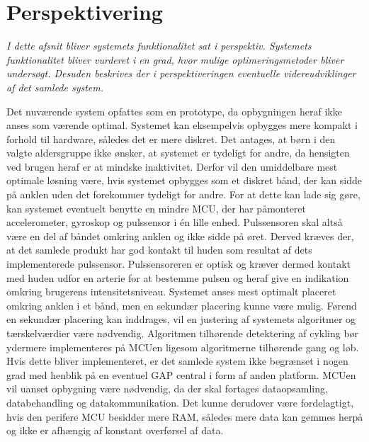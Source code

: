 \section{Perspektivering}
\textit{I dette afsnit bliver systemets funktionalitet sat i perspektiv. Systemets funktionalitet bliver vurderet i en grad, hvor mulige optimeringsmetoder bliver undersøgt. Desuden beskrives der i perspektiveringen eventuelle videreudviklinger af det samlede system.}

Det nuværende system opfattes som en prototype, da opbygningen heraf ikke anses som værende optimal. Systemet kan eksempelvis opbygges mere kompakt i forhold til hardware, således det er mere diskret. Det antages, at børn i den valgte aldersgruppe ikke ønsker, at systemet er tydeligt for andre, da hensigten ved brugen heraf er at mindske inaktivitet. Derfor vil den umiddelbare mest optimale løsning være, hvis systemet opbygges som et diskret bånd, der kan sidde på anklen uden det forekommer tydeligt for andre. For at dette kan lade sig gøre, kan systemet eventuelt benytte en mindre MCU, der har påmonteret accelerometer, gyroskop og pulssensor i én lille enhed. Pulssensoren skal altså være en del af båndet omkring anklen og ikke sidde på øret. Derved kræves der, at det samlede produkt har god kontakt til huden som resultat af dets implementerede pulssensor. Pulssensoreren er optisk og kræver dermed kontakt med huden udfor en arterie for at bestemme pulsen og heraf give en indikation omkring brugerens intensitetsniveau. Systemet anses mest optimalt placeret omkring anklen i et bånd, men en sekundær placering kunne være mulig. Førend en sekundær placering kan inddrages, vil en justering af systemets algoritmer og tærskelværdier være nødvendig. Algoritmen tilhørende detektering af cykling bør ydermere implementeres på MCUen ligesom algoritmerne tilhørende gang og løb. Hvis dette bliver implementeret, er det samlede system ikke begrænset i nogen grad med henblik på en eventuel GAP central i form af anden platform. MCUen vil uanset opbygning være nødvendig, da der skal fortages dataopsamling, databehandling og datakommunikation. Det kunne derudover være fordelagtigt, hvis den perifere MCU besidder mere RAM, således mere data kan gemmes herpå og ikke er afhængig af konstant overførsel af data. \\
